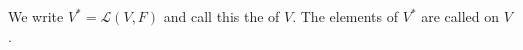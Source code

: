 We write $V^* = \mathcal{L}(V, F)$ and call this the  of $V$. The elements of $V^*$ are called  on $V$.
